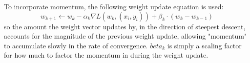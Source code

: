 \documentclass{article}
\begin{document}
\newline
To incorporate momentum, the following weight update equation is used:
$$ w_{k + 1} \gets w_k - \alpha_k \nabla L(w_k, (x_i, y_i)) + \beta_k \cdot (w_k - w_{k - 1}) $$
so the amount the weight vector updates by, in the direction of steepest descent, accounts for the magnitude of the previous weight update, allowing "momentum" to accumulate slowly in the rate of convergence. $ beta_k $ is simply a scaling factor for how much to factor the momentum in during the weight update.
\end{document}
